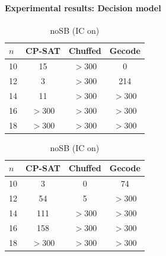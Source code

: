 \documentclass{article}
\begin{document}
\paragraph{Experimental results: Decision model}
\mbox{}\par\vspace{0.5em}
\begin{table}[H]\centering\small
\begin{minipage}{.48\textwidth}\centering
\begin{tabular}{l|ccc}\toprule
$n$ & CP-SAT & Chuffed & Gecode\\\midrule
10 & 15 & \(>300\) & 0\\
12 & 3 & \(>300\) & 214\\
14 & 11 & \(>300\) & \(>300\)\\
16 & \(>300\) & \(>300\) & \(>300\)\\
18 & \(>300\) & \(>300\) & \(>300\)\\\bottomrule
\end{tabular}
\caption{Baseline (SB+IC)}
\end{minipage}\hfill
\begin{minipage}{.48\textwidth}\centering
\begin{tabular}{l|ccc}\toprule
$n$ & CP-SAT & Chuffed & Gecode\\\midrule
10 & 3 & 0 & 74\\
12 & 54 & 5 & \(>300\)\\
14 & 111 & \(>300\) & \(>300\)\\
16 & 158 & \(>300\) & \(>300\)\\
18 & \(>300\) & \(>300\) & \(>300\)\\\bottomrule
\end{tabular}
\caption{noSB (IC on)}
\end{minipage}
\end{table}
\end{document}
